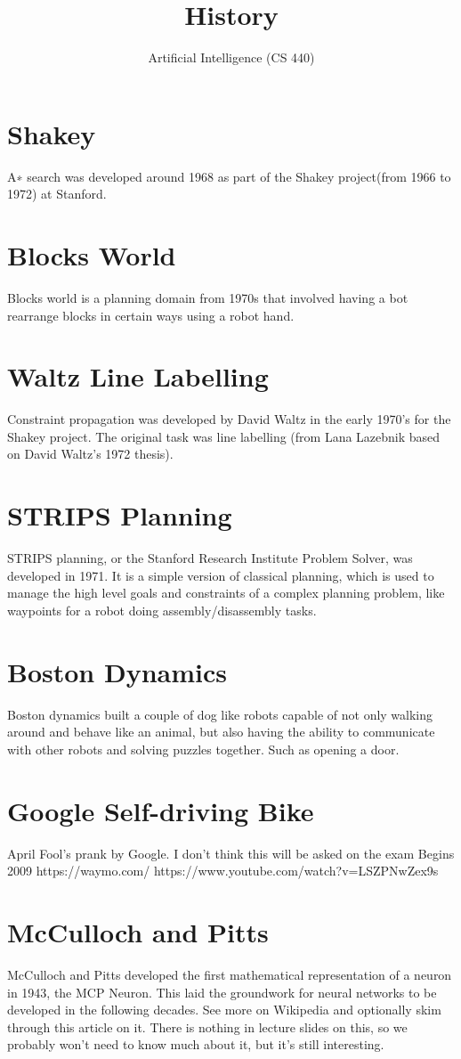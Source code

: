 \documentclass[11pt]{article}
\title{History}
\author{Artificial Intelligence (CS 440)}
\begin{document}
  \maketitle
  \tableofcontents

  \section{Shakey}
    A∗ search was developed around 1968 as part of the
    Shakey project(from 1966 to 1972) at Stanford.

  \section{Blocks World}
    Blocks world is a planning domain from 1970s that involved
    having a bot rearrange blocks in certain ways using a robot hand.

  \section{Waltz Line Labelling}
    Constraint propagation was developed by David Waltz
    in the early 1970's for the Shakey project. The original
    task was line labelling (from Lana Lazebnik based on
    David Waltz's 1972 thesis).

  \section{STRIPS Planning}
    STRIPS planning, or the Stanford Research Institute Problem Solver,
    was developed in 1971. It is a simple version of classical planning,
    which is used to manage the high level goals and constraints of a
    complex planning problem, like waypoints for a
    robot doing assembly/disassembly tasks.

  \section{Boston Dynamics}
    Boston dynamics built a couple of dog like robots capable of not
    only walking around and behave like an animal, but also having
    the ability to communicate with other robots and solving puzzles together.
    Such as opening a door.

  \section{Google Self-driving Bike}
    April Fool’s prank by Google. I don’t think this will be asked on the exam
    Begins 2009
    https://waymo.com/
    https://www.youtube.com/watch?v=LSZPNwZex9s

  \section{McCulloch and Pitts}
    McCulloch and Pitts developed the first mathematical representation of
    a neuron in 1943, the MCP Neuron. This laid the groundwork for neural
    networks to be developed in the following decades. See more on Wikipedia
    and optionally skim through this article on it. There is nothing in lecture
    slides on this, so we probably won’t need to know much about it,
    but it's still interesting.
\end{document}
